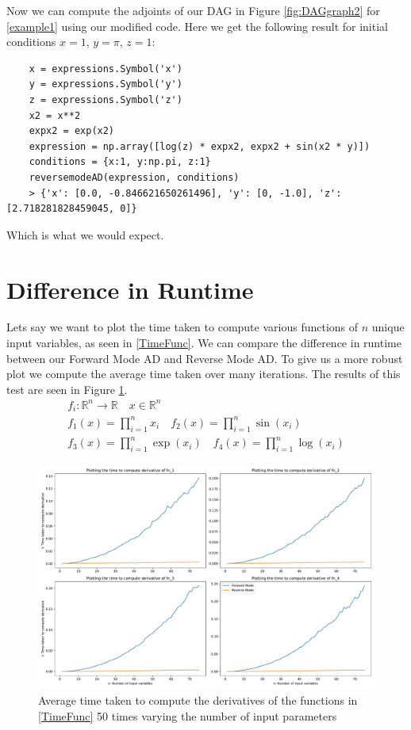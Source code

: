 \documentclass{article}
\begin{document}
Now we can compute the adjoints of our DAG in Figure \ref{fig:DAGgraph2} for \eqref{example1} using our modified code. Here we get the following result for initial conditions $x=1$, $y=\pi$, $z=1$:

\begin{verbatim}
    x = expressions.Symbol('x')
    y = expressions.Symbol('y')
    z = expressions.Symbol('z')
    x2 = x**2
    expx2 = exp(x2)
    expression = np.array([log(z) * expx2, expx2 + sin(x2 * y)])
    conditions = {x:1, y:np.pi, z:1}
    reversemodeAD(expression, conditions)
    > {'x': [0.0, -0.846621650261496], 'y': [0, -1.0], 'z': [2.718281828459045, 0]}
\end{verbatim}

Which is what we would expect.




\section{Difference in Runtime}

Lets say we want to plot the time taken to compute various functions of $n$ unique input variables, as seen in \eqref{TimeFunc}. We can compare the difference in runtime between our Forward Mode AD and Reverse Mode AD. To give us a more robust plot we compute the average time taken over many iterations. The results of this test are seen in Figure \ref{fig:TimeDiff}.
\begin{equation} \label{TimeFunc}
    \begin{gathered}
        f_i: \mathbb{R}^n \longrightarrow \mathbb{R} \quad x \in \mathbb{R}^n \\
        f_1(x) = \prod_{i=1}^n x_i  \quad f_2(x) = \prod_{i=1}^n \sin(x_i) \\
        f_3(x) = \prod_{i=1}^n \exp(x_i)  \quad f_4(x) = \prod_{i=1}^n \log(x_i)
    \end{gathered}
\end{equation}

\begin{figure}[h]
    \centering
    \includegraphics[width=15cm]{images/Graph_TimeDiff2.pdf}
    \caption{Average time taken to compute the derivatives of the functions in \eqref{TimeFunc} 50 times varying the number of input parameters}
    \label{fig:TimeDiff}
\end{figure}
\end{document}
